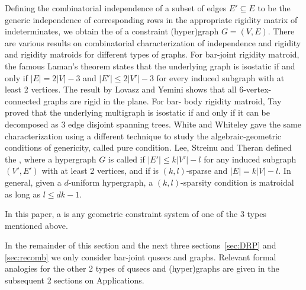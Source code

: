 Defining the combinatorial independence of a subset of edges $E'
\subseteq E$ to be the generic independence of corresponding rows in
the appropriate rigidity matrix of indeterminates, we obtain the
 of a constraint (hyper)graph $G = (V,E)$.%
There are various results on combinatorial characterization of
independence and rigidity  and rigidity matroids for different types
of graphs. For bar-joint rigidity matroid, the famous Laman's theorem
\cite{laman1970graphs} states that the underlying graph is isostatic if and only if
$|E| = 2|V|-3$ and $|E'| \le 2|V'|-3$ for every induced subgraph with
at least 2 vertices. The result by Lovasz and Yemini \cite{lovasz1982generic}  shows
that all 6-vertex-connected graphs are rigid in the plane. For bar-
body rigidity matroid, Tay \cite{tay1976rigidity} proved that the underlying
multigraph is isostatic if and only if it can be decomposed as $3$
edge disjoint spanning trees. White and Whiteley \cite{white1987algebraic} gave the
same characterization using a different technique to study the
algebraic-geometric conditions of genericity, called pure condition.
Lee, Streinu and Theran \cite{lee2007graded} defined the , where a hypergraph $G$ is called  if
$|E'| \le k|V'| - l$ for any induced subgraph $(V',E')$ with at least
2 vertices, and  if is $(k,l)$-sparse and $|E| =
k|V| - l$. In general, given a $d$-uniform hypergraph, a
$(k,l)$-sparsity condition is matroidal as long as $l \le dk-1$.



In this paper, a  is any  geometric
constraint system of one of the 3 types mentioned above.

\medskip\noindent
\note In the remainder of this section and the next three
sections~\ref{sec:DRP} and \ref{sec:recomb} we only consider bar-joint
qusecs and graphs. Relevant formal analogies for the other 2 types of
qusecs and (hyper)graphs are given in the subsequent 2 sections on
Applications.





